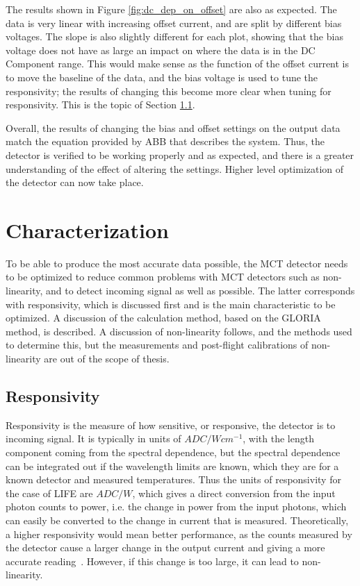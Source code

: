 The results shown in Figure \ref{fig:dc_dep_on_offset} are also as expected. The data is very linear with increasing offset current, and are split by different bias voltages. The slope is also slightly different for each plot, showing that the bias voltage does not have as large an impact on where the data is in the DC Component range. This would make sense as the function of the offset current is to move the baseline of the data, and the bias voltage is used to tune the responsivity; the results of changing this become more clear when tuning for responsivity. This is the topic of Section \ref{responsivity_sec}.

Overall, the results of changing the bias and offset settings on the output data match the equation provided by ABB that describes the system. Thus, the detector is verified to be working properly and as expected, and there is a greater understanding of the effect of altering the settings. Higher level optimization of the detector can now take place.

\section{Characterization}\label{detector_char}
To be able to produce the most accurate data possible, the MCT detector needs to be optimized to reduce common problems with MCT detectors such as non-linearity, and to detect incoming signal as well as possible. The latter corresponds with responsivity, which is discussed first and is the main characteristic to be optimized. A discussion of the calculation method, based on the GLORIA method, is described. A discussion of non-linearity follows, and the methods used to determine this, but the measurements and post-flight calibrations of non-linearity are out of the scope of thesis.

\subsection{Responsivity}\label{responsivity_sec}
Responsivity is the measure of how sensitive, or responsive, the detector is to incoming signal. It is typically in units of $ADC/Wcm^{-1}$, with the length component coming from the spectral dependence, but the spectral dependence can be integrated out if the wavelength limits are known, which they are for a known detector and measured temperatures. Thus the units of responsivity for the case of LIFE are $ADC/W$, which gives a direct conversion from the input photon counts to power, i.e. the change in power from the input photons, which can easily be converted to the change in current that is measured. Theoretically, a higher responsivity would mean better performance, as the counts measured by the detector cause a larger change in the output current and giving a more accurate reading~\citep{GLORIA_PhD}. However, if this change is too large, it can lead to non-linearity.

